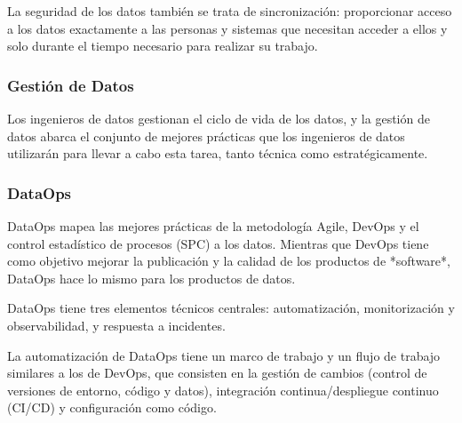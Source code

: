 \documentclass[12pt]{book}
\begin{document}
La seguridad de los datos también se trata de sincronización: proporcionar acceso a los datos exactamente a las personas y sistemas que necesitan acceder a ellos y solo durante el tiempo necesario para realizar su trabajo.

\subsubsection{Gestión de Datos}
Los ingenieros de datos gestionan el ciclo de vida de los datos, y la gestión de datos abarca el conjunto de mejores prácticas que los ingenieros de datos utilizarán para llevar a cabo esta tarea, tanto técnica como estratégicamente.



\subsubsection{DataOps}
DataOps mapea las mejores prácticas de la metodología Agile, DevOps y el control estadístico de procesos (SPC) a los datos. Mientras que DevOps tiene como objetivo mejorar la publicación y la calidad de los productos de *software*, DataOps hace lo mismo para los productos de datos.

DataOps tiene tres elementos técnicos centrales: automatización, monitorización y observabilidad, y respuesta a incidentes.

La automatización de DataOps tiene un marco de trabajo y un flujo de trabajo similares a los de DevOps, que consisten en la gestión de cambios (control de versiones de entorno, código y datos), integración continua/despliegue continuo (CI/CD) y configuración como código.\\
\end{document}
